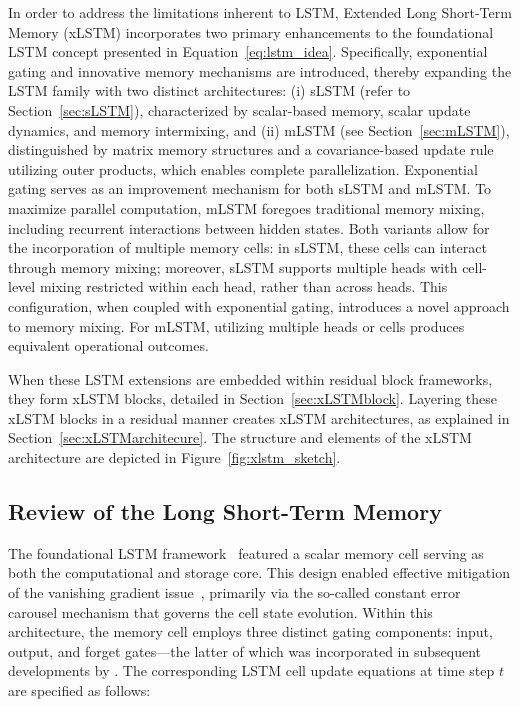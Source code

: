 In order to address the limitations inherent to LSTM, Extended Long Short-Term Memory (xLSTM) incorporates two primary enhancements to the foundational LSTM concept presented in Equation~\eqref{eq:lstm_idea}. Specifically, exponential gating and innovative memory mechanisms are introduced, thereby expanding the LSTM family with two distinct architectures: (i) sLSTM (refer to Section~\ref{sec:sLSTM}), characterized by scalar-based memory, scalar update dynamics, and memory intermixing, and (ii) mLSTM (see Section~\ref{sec:mLSTM}), distinguished by matrix memory structures and a covariance-based update rule utilizing outer products, which enables complete parallelization. Exponential gating serves as an improvement mechanism for both sLSTM and mLSTM. To maximize parallel computation, mLSTM foregoes traditional memory mixing, including recurrent interactions between hidden states. Both variants allow for the incorporation of multiple memory cells: in sLSTM, these cells can interact through memory mixing; moreover, sLSTM supports multiple heads with cell-level mixing restricted within each head, rather than across heads. This configuration, when coupled with exponential gating, introduces a novel approach to memory mixing. For mLSTM, utilizing multiple heads or cells produces equivalent operational outcomes.

When these LSTM extensions are embedded within residual block frameworks, they form xLSTM blocks, detailed in Section~\ref{sec:xLSTMblock}. Layering these xLSTM blocks in a residual manner creates xLSTM architectures, as explained in Section~\ref{sec:xLSTMarchitecure}. The structure and elements of the xLSTM architecture are depicted in Figure~\ref{fig:xlstm_sketch}.

\subsection{Review of the Long Short-Term Memory}
\label{sec:orgLSTM}

The foundational LSTM framework~\citep{Hochreiter:91,Hochreiter:97nips,Hochreiter:97} featured a scalar memory cell serving as both the computational and storage core. This design enabled effective mitigation of the vanishing gradient issue~\citep{Hochreiter:91,Hochreiter:00book}, primarily via the so-called constant error carousel mechanism that governs the cell state evolution. Within this architecture, the memory cell employs three distinct gating components: input, output, and forget gates—the latter of which was incorporated in subsequent developments by \citet{Gers:00}. The corresponding LSTM cell update equations at time step $t$ are specified as follows:

